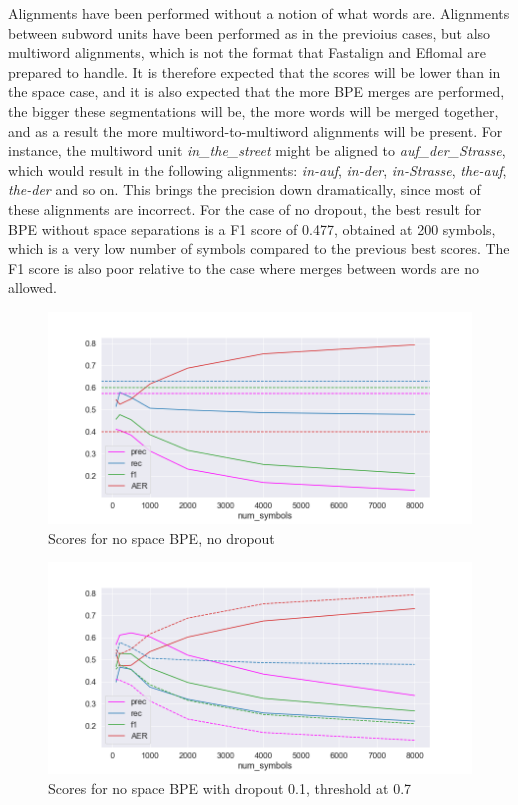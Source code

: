 Alignments have been performed without a notion of what words are. Alignments between subword units have been performed as in the previoius cases, but also multiword alignments, which is not the format that Fastalign and Eflomal are prepared to handle. It is therefore expected that the scores will be lower than in the space case, and it is also expected that the more BPE merges are performed, the bigger these segmentations will be, the more words will be merged together, and as a result the more multiword-to-multiword alignments will be present. For instance, the multiword unit \emph{in\_the\_street} might be aligned to \emph{auf\_der\_Strasse}, which would result in the following alignments: \emph{in-auf}, \emph{in-der}, \emph{in-Strasse}, \emph{the-auf}, \emph{the-der} and so on. This brings the precision down dramatically, since most of these alignments are incorrect. For the case of no dropout, the best result for BPE without space separations is a F1 score of 0.477, obtained at 200 symbols, which is a very low number of symbols compared to the previous best scores. The F1 score is also poor relative to the case where merges between words are no allowed.

\begin{figure}[!ht]
    \centering
    \includegraphics[width=11.5cm]{../reports/scores_normal_bpe/eng_deu_ns_fastalign.png}
    \caption{Scores for no space BPE, no dropout}
\end{figure}

\begin{figure}[!ht]
    \centering
    \includegraphics[width=11.5cm]{../reports/scores_dropout_bpe/no space/0.1/scores_ns_0.7_thres.png}
    \caption{Scores for no space BPE with dropout 0.1, threshold at 0.7}
\end{figure}

